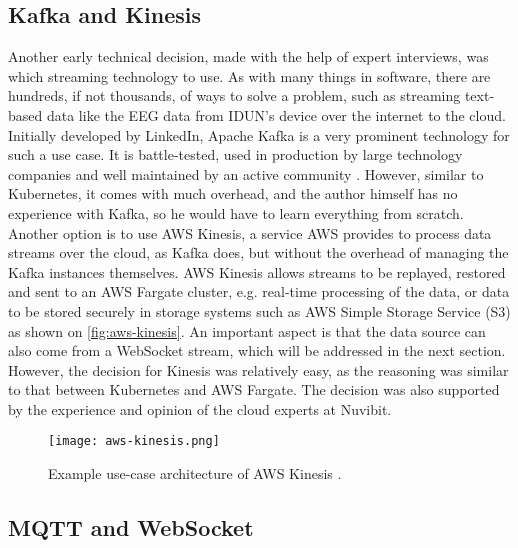 \subsection{Kafka and Kinesis}
\label{chapter4-kafka-aws-kinesis}

Another early technical decision, made with the help of expert interviews, was which streaming technology to use. As with many things in software, there are hundreds, if not thousands, of ways to solve a problem, such as streaming text-based data like the EEG data from IDUN's device over the internet to the cloud. Initially developed by LinkedIn, Apache Kafka is a very prominent technology for such a use case. It is battle-tested, used in production by large technology companies \citep{apache_apache_nodate} and well maintained by an active community \citep{noauthor_apache_2022}. However, similar to Kubernetes, it comes with much overhead, and the author himself has no experience with Kafka, so he would have to learn everything from scratch. Another option is to use AWS Kinesis, a service AWS provides to process data streams over the cloud, as Kafka does, but without the overhead of managing the Kafka instances themselves. AWS Kinesis allows streams to be replayed, restored and sent to an AWS Fargate cluster, e.g. real-time processing of the data, or data to be stored securely in storage systems such as AWS Simple Storage Service (S3) as shown on \autoref{fig:aws-kinesis}. An important aspect is that the data source can also come from a WebSocket stream, which will be addressed in the next section. However, the decision for Kinesis was relatively easy, as the reasoning was similar to that between Kubernetes and AWS Fargate. The decision was also supported by the experience and opinion of the cloud experts at Nuvibit.

\begin{figure}[!ht]
  \centering
  \texttt{[image: aws-kinesis.png]}
  \caption{Example use-case architecture of AWS Kinesis \citep{amazon_web_services_inc_amazon_nodate}.}
  \label{fig:aws-kinesis}
\end{figure}

\subsection{MQTT and WebSocket}
\label{chapter4-mqtt-and-websocket}

